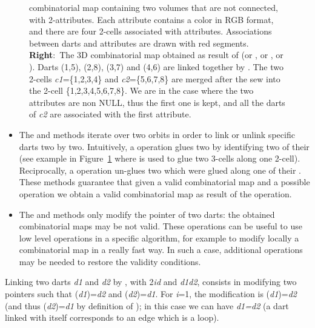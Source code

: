 \begin{figure}
{    combinatorial map containing two volumes that are not connected,
    with 2-attributes. Each attribute contains a color in RGB format,
    and there are four 2-cells associated with attributes.
    Associations between darts and attributes are drawn with red
    segments. \textbf{Right}:~The 3D combinatorial map obtained as
    result of  (or , or
    , or ). Darts (1,5), (2,8),
    (3,7) and (4,6) are linked together by \betatrois{}. The two 2-cells
    \emph{c1}=\{1,2,3,4\} and \emph{c2}=\{5,6,7,8\} are merged after the sew
    into the 2-cell \{1,2,3,4,5,6,7,8\}. We are in the case where
    the two attributes are non NULL, thus the first one is kept, and
    all the darts of \emph{c2} are associated with the first attribute.}
  \label{fig-exemple-sew}
\end{figure}
\begin{itemize}
\item The  and  methods iterate over two orbits in
  order to link or unlink specific darts two by two.  Intuitively, a
   operation glues two  by identifying two of
  their  (see example in Figure~\ref{fig-exemple-sew}
  where  is used to glue two 3-cells along one 2-cell).
  Reciprocally, a  operation un-glues two  which
  were glued along one of their .
  These methods guarantee that given a valid combinatorial map and a
  possible operation we obtain a valid combinatorial map as result of
  the operation.

\item
\begin{ccAdvanced}
  The  and  methods only modify
  the pointer of two darts: the obtained combinatorial maps may be not
  valid. These operations can be useful to use low level operations
  in a specific algorithm, for example to modify locally a
  combinatorial map in a really fast way. In such a case, additional
  operations may be needed to restore the validity conditions.
\end{ccAdvanced}
\end{itemize}

Linking two darts \emph{d1} and \emph{d2} by \betai{}, with 2\myleq{}\emph{i}\myleq{}\emph{d}
and \emph{d1}\myneq{}\emph{d2}, consists in modifying two \betai{} pointers such that
\betai{}(\emph{d1})=\emph{d2} and \betai{}(\emph{d2})=\emph{d1}. For \emph{i}=1, the modification
is \betaun{}(\emph{d1})=\emph{d2} (and thus \betazero{}(\emph{d2})=\emph{d1} by definition of
\betazero{}); in this case we can have \emph{d1=d2} (a dart linked with
itself corresponds to an edge which is a loop).

